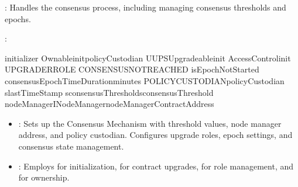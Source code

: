 \documentclass[letterpaper,10pt,english]{sphinxmanual}
\begin{document}
\sphinxAtStartPar
{}

\sphinxAtStartPar
{}:
Handles the consensus process, including managing consensus thresholds and epochs.

\sphinxAtStartPar
{}:

\begin{sphinxVerbatim}[commandchars=\\\{\}]
initializer
\PYGZus{}\PYGZus{}Ownable\PYGZus{}initpolicyCustodian
\PYGZus{}\PYGZus{}UUPSUpgradeable\PYGZus{}init
\PYGZus{}\PYGZus{}AccessControl\PYGZus{}init
UPGRADER\PYGZus{}ROLE
CONSENSUS\PYGZus{}NOT\PYGZus{}REACHED
isEpochNotStarted
consensusEpochTimeDurationminutes
POLICY\PYGZus{}CUSTODIANpolicyCustodian
s\PYGZus{}lastTimeStamp
s\PYGZus{}consensusThreshold\PYGZus{}s\PYGZus{}consensusThreshold
nodeManagerINodeManagernodeManagerContractAddress
\end{sphinxVerbatim}
\begin{itemize}
\item {} 
\sphinxAtStartPar
{}: Sets up the Consensus Mechanism with threshold values, node manager address, and policy custodian. Configures upgrade roles, epoch settings, and consensus state management.

\item {} 
\sphinxAtStartPar
{}: Employs  for initialization,  for contract upgrades,  for role management, and  for ownership.

\end{itemize}
\end{document}
